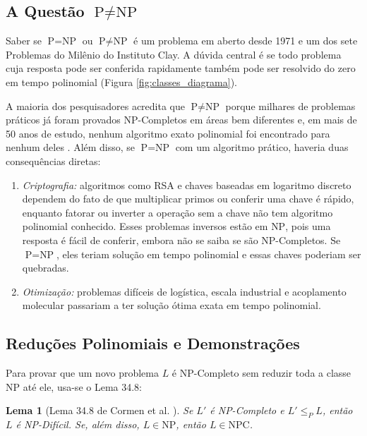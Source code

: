 \documentclass[conference]{IEEEtran}
\theoremstyle{definition}
\theoremstyle{plain}
\newtheorem{lema}{Lema}
\begin{document}
\subsection{A Questão $\text{P} \neq \text{NP}$}

Saber se $\text{P} = \text{NP}$ ou $\text{P} \neq \text{NP}$ é um problema em aberto desde 1971 e um dos sete Problemas do Milênio do Instituto Clay. A dúvida central é se todo problema cuja resposta pode ser conferida rapidamente também pode ser resolvido do zero em tempo polinomial (Figura \ref{fig:classes_diagrama}).

A maioria dos pesquisadores acredita que $\text{P} \neq \text{NP}$ porque milhares de problemas práticos já foram provados NP-Completos em áreas bem diferentes e, em mais de 50 anos de estudo, nenhum algoritmo exato polinomial foi encontrado para nenhum deles \cite{cormen2012algoritmos}. Além disso, se $\text{P} = \text{NP}$ com um algoritmo prático, haveria duas consequências diretas:
\begin{enumerate}
    \item \textit{Criptografia:} algoritmos como RSA e chaves baseadas em logaritmo discreto dependem do fato de que multiplicar primos ou conferir uma chave é rápido, enquanto fatorar ou inverter a operação sem a chave não tem algoritmo polinomial conhecido. Esses problemas inversos estão em $\text{NP}$, pois uma resposta é fácil de conferir, embora não se saiba se são NP-Completos. Se $\text{P} = \text{NP}$, eles teriam solução em tempo polinomial e essas chaves poderiam ser quebradas.
    \item \textit{Otimização:} problemas difíceis de logística, escala industrial e acoplamento molecular passariam a ter solução ótima exata em tempo polinomial.
\end{enumerate}

\subsection{Reduções Polinomiais e Demonstrações}

Para provar que um novo problema $L$ é NP-Completo sem reduzir toda a classe $\text{NP}$ até ele, usa-se o Lema 34.8:

\begin{lema}[Lema 34.8 de Cormen et al. \cite{cormen2012algoritmos}]
Se $L'$ é NP-Completo e $L' \le_P L$, então $L$ é NP-Difícil. Se, além disso, $L \in \text{NP}$, então $L \in \text{NPC}$.
\end{lema}
\end{document}

